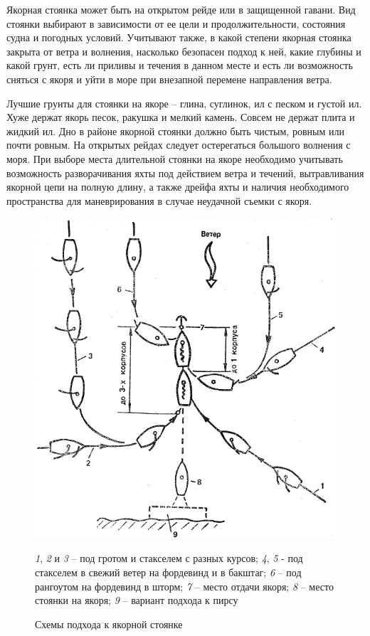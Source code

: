 \documentclass[a4paper, 12pt, twoside, final, book, russian, fittopage, cyremdash]{ncc}
\begin{document}
Якорная стоянка может быть на открытом рейде или в защищенной гавани. Вид стоянки выбирают в зависимости от ее цели и продолжительности, состояния судна и погодных условий. Учитывают также, в какой степени якорная стоянка закрыта от ветра и волнения, насколько безопасен подход к ней, какие глубины и какой грунт, есть ли приливы и течения в данном месте и есть ли возможность сняться с якоря и уйти в море при внезапной перемене направления ветра.

Лучшие грунты для стоянки на якоре \--- глина, суглинок, ил с песком и густой ил. Хуже держат якорь песок, ракушка и мелкий камень. Совсем не держат плита и жидкий ил. Дно в районе якорной стоянки должно быть чистым, ровным или почти ровным. На открытых рейдах следует остерегаться большого волнения с моря. При выборе места длительной стоянки на якоре необходимо учитывать возможность разворачивания яхты под действием ветра и течений, вытравливания якорной цепи на полную длину, а также дрейфа яхты и наличия необходимого пространства для маневрирования в случае неудачной съемки с якоря.

\begin{figure}[htb]
  \centering{}
  \includegraphics[scale=1.3]{0132P}
  \caption{Схемы подхода к якорной стоянке}
  \label{fig:132}
  \small
  \centering{}
  \textit{1}, \textit{2} и \textit{3} \--- под гротом и стакселем с разных курсов; \textit{4}, \textit{5} \-- под стакселем в свежий ветер на фордевинд и в бакштаг; \textit{6} \--- под рангоутом на фордевинд в шторм; \textit{7} \--- место отдачи якоря; \textit{8} \--- место стоянки на якоря; \textit{9} \--- вариант подхода к пирсу 
\end{figure}
\end{document}
